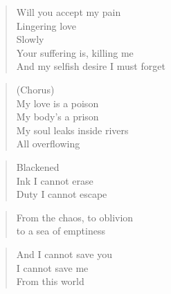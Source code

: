 

\begin{minipage}{0.6\textwidth}
    \begin{verse}
    Will you accept my pain \\
    Lingering love \\
    Slowly \\
    Your suffering is, killing me \\
    And my selfish desire I must forget
    \end{verse}

    \begin{verse}
    (Chorus) \\
    My love is a poison \\
    My body's a prison \\
    My soul leaks inside rivers \\
    All overflowing
    \end{verse}

    \begin{verse}
    Blackened \\
    Ink I cannot erase \\
    Duty I cannot escape
    \end{verse}

    \begin{verse}
    From the chaos, to oblivion \\
    to a sea of emptiness
    \end{verse}

    \begin{verse}
    And I cannot save you \\
    I cannot save me \\
    From this world
    \end{verse}

\end{minipage}
\clearpage
